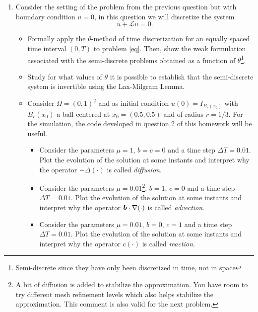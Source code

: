 \documentclass{article}
\renewcommand{\vec}{\vectorsym}
\begin{document}
\begin{enumerate}
    \item Consider the setting of the problem from the previous question but with boundary condition $u=0$, in this question we will discretize the system
                \begin{equation}\label{eq}
                    \dot u + \mathcal L u = 0.
                \end{equation}
            \begin{itemize}
                \item{} Formally apply the $\theta$-method of time discretization for an equally spaced time interval $(0,T)$ to problem \eqref{eq}. Then, show the weak formulation associated with the semi-discrete problems obtained as a function of $\theta$\footnote{Semi-discrete since they have only been discretized in time, not in space}.
                \item{} Study for what values of $\theta$ it is possible to establish that the semi-discrete system is invertible using the Lax-Milgram Lemma.
                \item Consider $\Omega = (0,1)^2$ and as initial condition $u(0) = I_{B_r(x_0)}$ with $B_r(x_0)$ a ball centered at $x_0=(0.5,0.5)$ and of radius $r=1/3$. For the simulation, the code developed in question 2 of this homework will be useful.
                    \begin{itemize}
                        \item{} Consider the parameters $\mu=1$, $b=c=0$ and a time step $\Delta T=0.01$. Plot the evolution of the solution at some instants and interpret why the operator $-\Delta (\cdot)$ is called \emph{diffusion}. 
                        \item{} Consider the parameters $\mu=0.01$\footnote{A bit of diffusion is added to stabilize the approximation. You have room to try different mesh refinement levels which also helps stabilize the approximation. This comment is also valid for the next problem.}, $b=1$, $c=0$ and a time step $\Delta T=0.01$. Plot the evolution of the solution at some instants and interpret why the operator $\vec b \cdot\nabla(\cdot)$ is called \emph{advection}.
                        \item{} Consider the parameters $\mu=0.01$, $b=0$, $c=1$ and a time step $\Delta T=0.01$. Plot the evolution of the solution at some instants and interpret why the operator $c (\cdot)$ is called \emph{reaction}.
                    \end{itemize}
            \end{itemize}
\end{enumerate} %
\end{document}
